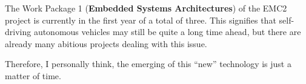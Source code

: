 The Work Package 1 (\textbf{Embedded Systems Architectures}) of the EMC2 project is currently in the first year of a total of three. This signifies that self-driving autonomous vehicles may still be quite a long time ahead, but there are already many abitious projects dealing with this issue. 

Therefore, I personally think, the emerging of this ``new'' technology is just a matter of time.